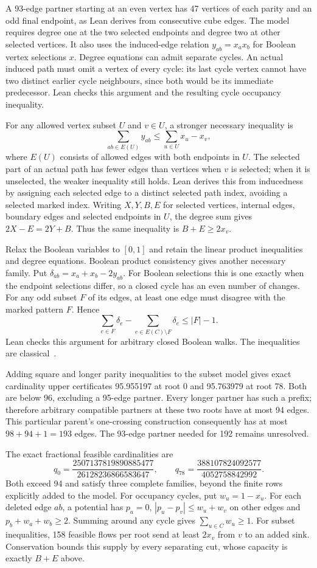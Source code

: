 \documentclass[11pt,a4paper]{article}
\begin{document}
A 93-edge partner starting at an even vertex has 47 vertices of each parity
and an odd final endpoint, as Lean derives from consecutive cube edges.
The model requires degree one at the two selected endpoints and degree two
at other selected vertices. It also uses the induced-edge relation
$y_{ab}=x_ax_b$ for Boolean vertex selections $x$.
Degree equations can admit separate cycles. An actual induced path must omit
a vertex of every cycle: its last cycle vertex cannot have two distinct
earlier cycle neighbours, since both would be its immediate predecessor.
Lean checks this argument and the resulting cycle occupancy inequality.

For any allowed vertex subset $U$ and $v\in U$, a stronger necessary inequality is
\[
\sum_{ab\in E(U)}y_{ab}\le\sum_{u\in U}x_u-x_v,
\]
where $E(U)$ consists of allowed edges with both endpoints in $U$.
The selected part of an actual path has fewer edges than vertices when
$v$ is selected; when it is unselected, the weaker inequality still holds.
Lean derives this from inducedness by assigning each selected edge to a
distinct selected path index, avoiding a selected marked index.
Writing $X,Y,B,E$ for selected vertices, internal edges, boundary edges
and selected endpoints in $U$, the degree sum gives
$2X-E=2Y+B$. Thus the same inequality is $B+E\ge2x_v$.

Relax the Boolean variables to $[0,1]$ and retain the linear product
inequalities and degree equations. Boolean product consistency gives
another necessary family. Put $\delta_{ab}=x_a+x_b-2y_{ab}$.
For Boolean selections this is one exactly when the endpoint selections
differ, so a closed cycle has an even number of changes. For any odd
subset $F$ of its edges, at least one edge must disagree with the marked
pattern $F$. Hence
\[
\sum_{e\in F}\delta_e-\sum_{e\in E(C)\setminus F}\delta_e\le|F|-1.
\]
Lean checks this argument for arbitrary closed Boolean walks. The
inequalities are classical~\cite{barahona1986}.

Adding square and longer parity inequalities to the subset model gives
exact cardinality upper certificates 95.955197 at root 0 and 95.763979
at root 78. Both are below 96, excluding a 95-edge partner. Every longer
partner has such a prefix; therefore arbitrary compatible partners
at these two roots have at most 94 edges. This particular parent's
one-crossing construction consequently has at most $98+94+1=193$ edges.
The 93-edge partner needed for 192 remains unresolved.

The exact fractional feasible cardinalities are
\[
q_0=\frac{2507137819890885477}{26128236866583647},\qquad
q_{78}=\frac{388107824092577}{4052758842992}.
\]
Both exceed 94 and satisfy three complete families, beyond the finite
rows explicitly added to the model. For occupancy cycles, put $w_u=1-x_u$.
For each deleted edge $ab$, a potential has $p_a=0$,
$|p_u-p_v|\le w_u+w_v$ on other edges and $p_b+w_a+w_b\ge2$.
Summing around any cycle gives $\sum_{u\in C}w_u\ge1$.
For subset inequalities, 158 feasible flows per root send at least
$2x_v$ from $v$ to an added sink. Conservation bounds this supply by
every separating cut, whose capacity is exactly $B+E$ above.
\end{document}
